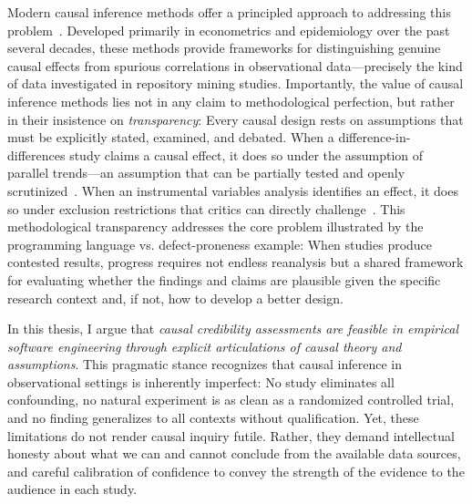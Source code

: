 Modern causal inference methods offer a principled approach to addressing this problem~\cite{cunningham2021causal, pearl2009causality, hansen2022econometrics}. 
Developed primarily in econometrics and epidemiology over the past several decades, these methods provide frameworks for distinguishing genuine causal effects from spurious correlations in observational data---precisely the kind of data investigated in repository mining studies.
Importantly, the value of causal inference methods lies not in any claim to methodological perfection, but rather in their insistence on \emph{transparency}: Every causal design rests on assumptions that must be explicitly stated, examined, and debated.
When a difference-in-differences study claims a causal effect, it does so under the assumption of parallel trends---an assumption that can be partially tested and openly scrutinized~\cite{marcus2021role}.
When an instrumental variables analysis identifies an effect, it does so under exclusion restrictions that critics can directly challenge~\cite{deaton2010instruments}.
This methodological transparency addresses the core problem illustrated by the programming language vs. defect-proneness example: 
When studies produce contested results, progress requires not endless reanalysis but a shared framework for evaluating whether the findings and claims are plausible given the specific research context and, if not, how to develop a better design.

In this thesis, I argue that \emph{causal credibility assessments are feasible in empirical software engineering through explicit articulations of causal theory and assumptions}.
This pragmatic stance recognizes that causal inference in observational settings is inherently imperfect: No study eliminates all confounding, no natural experiment is as clean as a randomized controlled trial, and no finding generalizes to all contexts without qualification.
Yet, these limitations do not render causal inquiry futile.
Rather, they demand intellectual honesty about what we can and cannot conclude from the available data sources, and careful calibration of confidence to convey the strength of the evidence to the audience in each study.

